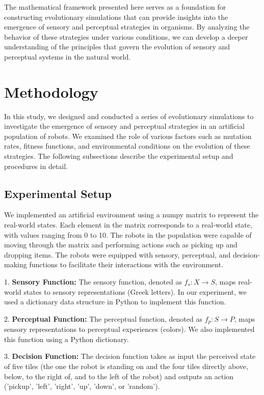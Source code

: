 \documentclass{article}[10pt]
\begin{document}
The mathematical framework presented here serves as a foundation for constructing evolutionary simulations that can provide insights into the emergence of sensory and perceptual strategies in organisms. By analyzing the behavior of these strategies under various conditions, we can develop a deeper understanding of the principles that govern the evolution of sensory and perceptual systems in the natural world.

\section{Methodology}

In this study, we designed and conducted a series of evolutionary simulations to investigate the emergence of sensory and perceptual strategies in an artificial population of robots. We examined the role of various factors such as mutation rates, fitness functions, and environmental conditions on the evolution of these strategies. The following subsections describe the experimental setup and procedures in detail.

\subsection{Experimental Setup}

We implemented an artificial environment using a numpy matrix to represent the real-world states. Each element in the matrix corresponds to a real-world state, with values ranging from 0 to 10. The robots in the population were capable of moving through the matrix and performing actions such as picking up and dropping items. The robots were equipped with sensory, perceptual, and decision-making functions to facilitate their interactions with the environment.

1. \textbf{Sensory Function:} The sensory function, denoted as $f_s: X \rightarrow S$, maps real-world states to sensory representations (Greek letters). In our experiment, we used a dictionary data structure in Python to implement this function.

2. \textbf{Perceptual Function:} The perceptual function, denoted as $f_p: S \rightarrow P$, maps sensory representations to perceptual experiences (colors). We also implemented this function using a Python dictionary.

3. \textbf{Decision Function:} The decision function takes as input the perceived state of five tiles (the one the robot is standing on and the four tiles directly above, below, to the right of, and to the left of the robot) and outputs an action ('pickup', 'left', 'right', 'up', 'down', or 'random').
\end{document}
